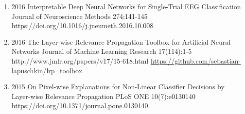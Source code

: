\documentclass[10pt,a4paper]{article} %
\begin{document}
{\begin{enumerate}
    \item {}
                        {2016}
                        {Interpretable Deep Neural Networks for Single-Trial EEG Classification}
                        {Journal of Neuroscience Methods}
                        {274:141-145}
                        {https://doi.org/10.1016/j.jneumeth.2016.10.008}

    \item {}
                        {2016}
                        {The Layer-wise Relevance Propagation Toolbox for Artificial Neural Networks}
                        {Journal of Machine Learning Research}
                        {17(114):1-5}
                        {http://www.jmlr.org/papers/v17/15-618.html}
                        {\href{https://github.com/sebastian-lapuschkin/lrp_toolbox}{https://github.com/sebastian-lapuschkin/lrp\_toolbox}}

    \item {}
                        {2015}
                        {On Pixel-wise Explanations for Non-Linear Classifier Decisions by Layer-wise Relevance Propagation}
                        {PLoS ONE}
                        {10(7):e0130140}
                        {https://doi.org/10.1371/journal.pone.0130140}
\end{enumerate}
}
\end{document}
